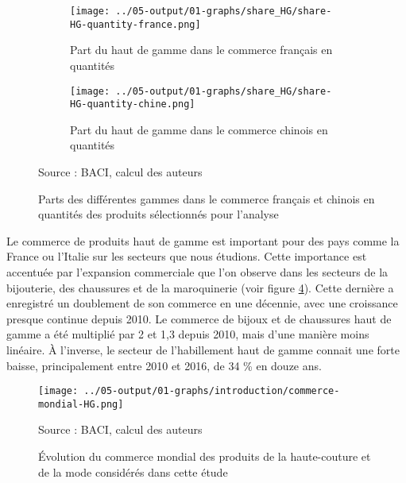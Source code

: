 \documentclass[french,10pt,a4paper]{article}
\begin{document}
\begin{figure}[!h]
  \centering
  \begin{subfigure}{\textwidth}
    \centering    
    \texttt{[image: ../05-output/01-graphs/share\_HG/share-HG-quantity-france.png]}
    \caption{Part du haut de gamme dans le commerce français en quantités}
    \label{fig:share-HG-quantity-france}
  \end{subfigure}
  \vspace{0.5cm}
  \begin{subfigure}{\textwidth}
    \centering
 \texttt{[image: ../05-output/01-graphs/share\_HG/share-HG-quantity-chine.png]}
 \caption{Part du haut de gamme dans le commerce chinois en quantités}
 \label{fig:share-HG-quantity-chine}
\end{subfigure}
\captionsetup{justification=raggedright,singlelinecheck=false, font=small}
  \caption*{Source : BACI, calcul des auteurs}
  \captionsetup{justification=centering, singlelinecheck=true, font=normalsize}
  \caption{Parts des différentes gammes dans le commerce français et chinois en quantités des produits sélectionnés pour l'analyse}
  \label{fig:share-HG-quantity-france-chine}
\end{figure}

\bigskip

Le commerce de produits haut de gamme est important pour des pays comme la France ou l'Italie sur les secteurs que nous étudions. Cette importance est accentuée par l'expansion commerciale que l'on observe dans les secteurs de la bijouterie, des chaussures et de la maroquinerie (voir figure \ref{fig:commerce-mondial-HG}). Cette dernière a enregistré un doublement de son commerce en une décennie, avec une croissance presque continue depuis 2010. Le commerce de bijoux et de chaussures haut de gamme a été multiplié par 2 et 1,3 depuis 2010, mais d'une manière moins linéaire. À l'inverse, le secteur de l'habillement haut de gamme connait une forte baisse, principalement entre 2010 et 2016, de 34 \% en douze ans.

\begin{figure}[!h]
  \centering
  \texttt{[image: ../05-output/01-graphs/introduction/commerce-mondial-HG.png]}
  \captionsetup{justification=raggedright,singlelinecheck=false, font=small}
  \caption*{Source : BACI, calcul des auteurs}
  \captionsetup{justification=centering, singlelinecheck=true, font=normalsize}
  \caption{Évolution du commerce mondial des produits de la haute-couture et de la mode considérés dans cette étude}
  \label{fig:commerce-mondial-HG}
\end{figure}
\end{document}

